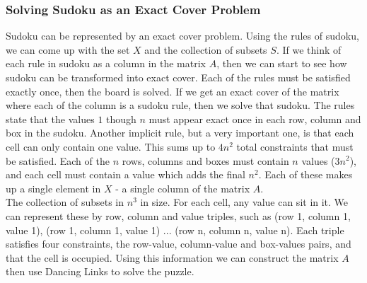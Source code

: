     \subsubsection{Solving Sudoku as an Exact Cover Problem}
    Sudoku can be represented by an exact cover problem. Using the rules of sudoku, we can come up with the set $X$ and the collection
    of subsets $S$. If we think of each rule in sudoku as a column in the matrix $A$, then we can start to see how sudoku can be transformed
    into exact cover. Each of the rules must be satisfied exactly once, then the board is solved. If we get an exact cover of the matrix where
    each of the column is a sudoku rule, then we solve that sudoku. The rules state that the values $1$ though $n$ must appear exact once in each
    row, column and box in the sudoku. Another implicit rule, but a very important one, is that each cell can only contain one value. This sums up
    to $4n^2$ total constraints that must be satisfied. Each of the $n$ rows, columns and boxes must contain $n$ values ($3n^2$), and each cell must
    contain a value which adds the final $n^2$. Each of these makes up a single element in $X$ - a single column of the matrix $A$.\\
    The collection of subsets in $n^3$ in size. For each cell, any value can sit in it. We can represent these by row, column and value triples,
    such as (row 1, column 1, value 1), (row 1, column 1, value 1) ... (row n, column n, value n). Each triple satisfies four constraints,
    the row-value, column-value and box-values pairs, and that the cell is occupied. Using this information we can construct the matrix $A$
    then use Dancing Links to solve the puzzle.

